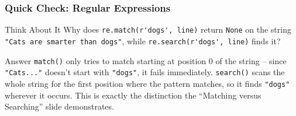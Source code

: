 \begin{frame}[fragile]\frametitle{Quick Check: Regular Expressions}
\begin{block}{Think About It}
Why does \lstinline|re.match(r'dogs', line)| return \texttt{None} on the string
\texttt{"Cats are smarter than dogs"}, while \lstinline|re.search(r'dogs', line)| finds it?
\end{block}
\pause
\begin{block}{Answer}
\lstinline|match()| only tries to match starting at position 0 of the string -- since
\texttt{"Cats..."} doesn't start with \texttt{"dogs"}, it fails immediately.
\lstinline|search()| scans the whole string for the first position where the pattern matches,
so it finds \texttt{"dogs"} wherever it occurs. This is exactly the distinction the ``Matching
versus Searching'' slide demonstrates.
\end{block}
\end{frame}

